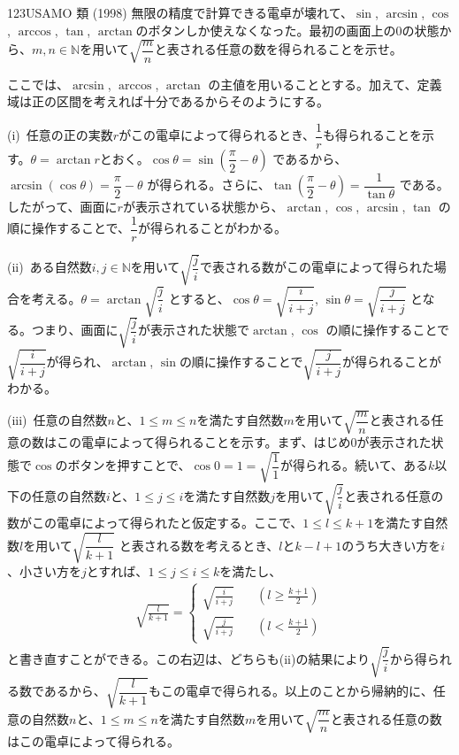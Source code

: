 \begin{thm}{123}{}{USAMO 類 (1998)}
 無限の精度で計算できる電卓が壊れて、$\sin$, $\arcsin$, $\cos$, $\arccos$, $\tan$, $\arctan$のボタンしか使えなくなった。最初の画面上の0の状態から、$m, n\in\mathbb{N}$を用いて$\sqrt{\dfrac{m}{n}}$と表される任意の数を得られることを示せ。
\end{thm}

ここでは、$\arcsin$, $\arccos$, $\arctan$ の主値を用いることとする。加えて、定義域は正の区間を考えれば十分であるからそのようにする。

(i)~任意の正の実数$r$がこの電卓によって得られるとき、$\dfrac{1}{r}$も得られることを示す。$\theta=\arctan r$とおく。$\cos\theta=\sin\left(\dfrac{\pi}{2}-\theta\right)$ であるから、$\arcsin(\cos\theta)=\dfrac{\pi}{2}-\theta$ が得られる。さらに、$\tan\left(\dfrac{\pi}{2}-\theta\right)=\dfrac{1}{\tan\theta}$ である。したがって、画面に$r$が表示されている状態から、$\arctan$, $\cos$, $\arcsin$, $\tan$ の順に操作することで、$\dfrac{1}{r}$が得られることがわかる。

(ii)~ある自然数$i, j\in\mathbb{N}$を用いて$\sqrt{\dfrac{j}{i}}$で表される数がこの電卓によって得られた場合を考える。$\theta=\arctan \sqrt{\dfrac{j}{i}}$ とすると、$\cos\theta=\sqrt{\dfrac{i}{i+j}}$, $\sin\theta=\sqrt{\dfrac{j}{i+j}}$ となる。つまり、画面に$\sqrt{\dfrac{j}{i}}$が表示された状態で$\arctan$, $\cos$ の順に操作することで$\sqrt{\dfrac{i}{i+j}}$が得られ、$\arctan$, $\sin$の順に操作することで$\sqrt{\dfrac{j}{i+j}}$が得られることがわかる。

(iii)~任意の自然数$n$と、$1\le m \le n$を満たす自然数$m$を用いて$\sqrt{\dfrac{m}{n}}$と表される任意の数はこの電卓によって得られることを示す。まず、はじめ$0$が表示された状態で$\cos$のボタンを押すことで、$\cos 0 = 1 = \sqrt{\dfrac{1}{1}}$が得られる。続いて、ある$k$以下の任意の自然数$i$と、$1\le j \le i$を満たす自然数$j$を用いて$\sqrt{\dfrac{j}{i}}$と表される任意の数がこの電卓によって得られたと仮定する。ここで、$1\le l \le k+1$を満たす自然数$l$を用いて$\sqrt{\dfrac{l}{k+1}}$ と表される数を考えるとき、$l$と$k-l+1$のうち大きい方を$i$、小さい方を$j$とすれば、$1\le j \le i \le k$を満たし、
\begin{align*}
 \sqrt{\frac{l}{k+1}}=\left\{
 \begin{aligned}
  \sqrt{\frac{i}{i+j}} &\quad\left(l\ge \frac{k+1}{2}\right) \\
  \sqrt{\frac{j}{i+j}} &\quad\left(l < \frac{k+1}{2}\right)
 \end{aligned}\right.
\end{align*}
と書き直すことができる。この右辺は、どちらも(ii)の結果により$\sqrt{\dfrac{j}{i}}$から得られる数であるから、$\sqrt{\dfrac{l}{k+1}}$もこの電卓で得られる。以上のことから帰納的に、任意の自然数$n$と、$1\le m \le n$を満たす自然数$m$を用いて$\sqrt{\dfrac{m}{n}}$と表される任意の数はこの電卓によって得られる。

